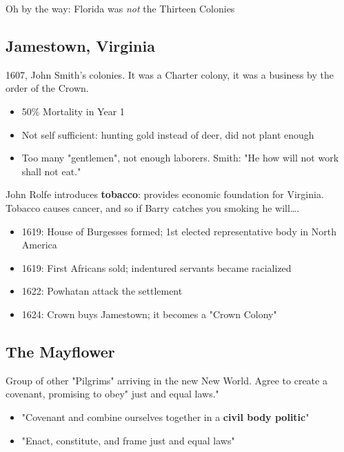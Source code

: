 \documentclass[letterpaper]{article}
\begin{document}
Oh by the way: Florida was \emph{not} the Thirteen Colonies


\subsection{Jamestown, Virginia}
\label{sec:org388db1d}
1607, John Smith's colonies. It was a Charter colony, it was a business by the order of the Crown.

\begin{itemize}
\item 50\% Mortality in Year 1
\item Not self sufficient: hunting gold instead of deer, did not plant enough
\item Too many "gentlemen", not enough laborers. Smith: "He how will not work shall not eat."
\end{itemize}

John Rolfe introduces \textbf{tobacco}: provides economic foundation for Virginia. Tobacco causes cancer, and so if Barry catches you smoking he will\ldots{}.

\begin{itemize}
\item 1619: House of Burgesses formed; 1st elected representative body in North America
\item 1619: First Africans sold; indentured servants became racialized
\item 1622: Powhatan attack the settlement
\item 1624: Crown buys Jamestown; it becomes a "Crown Colony"
\end{itemize}

\subsection{The Mayflower}
\label{sec:orgfa98d13}
Group of other "Pilgrims" arriving in the new New World. Agree to create a covenant, promising to obey" just and equal laws."

\begin{itemize}
\item "Covenant and combine ourselves together in a \textbf{\textbf{civil body politic}}"
\item "Enact, constitute, and frame just and equal laws"
\end{itemize}
\end{document}
